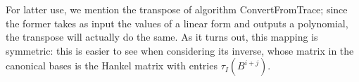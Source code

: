 \documentclass[12pt]{article}
\def\M {\ensuremath{\mathsf{M}}}
\def\F {\ensuremath{\mathbb{F}}}
\def\L {\ensuremath{\mathbb{L}}}
\def\mulmod {\ensuremath{\mathrm{mulmod}}}
\def\rev {\ensuremath{\mathrm{rev}}}
\begin{document}
For latter use, we mention the transpose of algorithm
ConvertFromTrace; since the former takes as input the values of a
linear form and outputs a polynomial, the transpose will actually do
the same. As it turns out, this mapping is symmetric: this is easier
to see when considering its inverse, whose matrix in the canonical
bases is the Hankel matrix with entries $\tau_I(B^{i+j})$.


\end{document}
